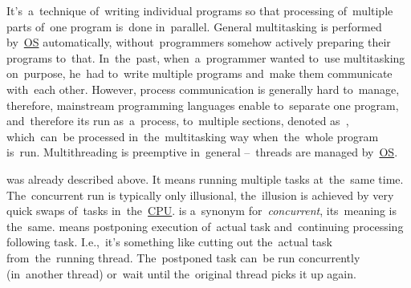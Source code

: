\label{multithreading}
It's~a~technique of~writing individual programs so that processing of~multiple parts of~one program is~done in~parallel.
General multitasking is performed by~\hyperref[os]{OS} automatically, without~programmers somehow actively preparing their programs to~that.
In~the~past, when~a~programmer wanted to~use multitasking on~purpose, he~had to~write multiple programs and~make them communicate with~each other.
However, process communication is generally hard to~manage, therefore, mainstream programming languages enable to~separate one program, and~therefore its run as~a~process, to~multiple sections, denoted as~, which~can~be processed in~the~multitasking way when~the~whole program is~run.
Multithreading is preemptive in~general --~threads are managed by~\hyperref[os]{OS}.
\newline

\label{concurrentparallelasynchronous}
\begin{itemize}
     was already described above.
            It means running multiple tasks at~the~same time.
            The~concurrent run is typically only illusional, the~illusion is achieved by very quick swaps of~tasks in~the~\hyperref[processorcpucore]{CPU}.
     is a~synonym for~\textit{concurrent}, its~meaning is the~same.
     means postponing execution of~actual task and~continuing processing following task.
            I.e.,~it's something like cutting out the~actual task from~the~running thread.
            The~postponed task can~be run concurrently (in~another thread) or~wait until the~original thread picks it up again.
\end{itemize}
\newline

